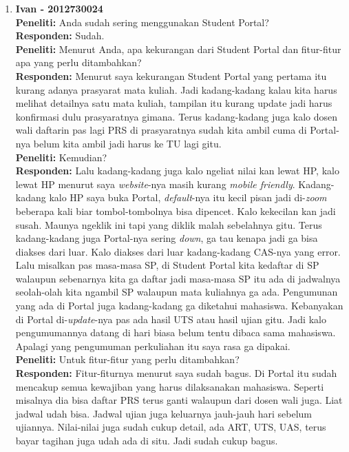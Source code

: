 \begin{enumerate}
\item\textbf{Ivan - 2012730024}\\
	\textbf{Peneliti:} Anda sudah sering menggunakan Student Portal?\\
	\textbf{Responden:} Sudah.\\
	\textbf{Peneliti:} Menurut Anda, apa kekurangan dari Student Portal dan fitur-fitur apa yang perlu ditambahkan?\\
	\textbf{Responden:} Menurut saya kekurangan Student Portal yang pertama itu kurang adanya prasyarat mata kuliah. Jadi kadang-kadang kalau kita harus melihat detailnya satu mata kuliah, tampilan itu kurang update jadi harus konfirmasi dulu prasyaratnya gimana. Terus kadang-kadang juga kalo dosen wali daftarin pas lagi PRS di prasyaratnya sudah kita ambil cuma di Portal-nya belum kita ambil jadi harus ke TU lagi gitu.\\
	\textbf{Peneliti:} Kemudian?\\
	\textbf{Responden:} Lalu kadang-kadang juga kalo ngeliat nilai kan lewat HP, kalo lewat HP menurut saya \textit{website}-nya masih kurang \textit{mobile friendly}. Kadang-kadang kalo HP saya buka Portal, \textit{default}-nya itu kecil pisan jadi di-\textit{zoom} beberapa kali biar tombol-tombolnya bisa dipencet. Kalo kekecilan kan jadi susah. Maunya ngeklik ini tapi yang diklik malah sebelahnya gitu. Terus kadang-kadang juga Portal-nya sering \textit{down}, ga tau kenapa jadi ga bisa diakses dari luar. Kalo diakses dari luar kadang-kadang CAS-nya yang error. Lalu misalkan pas masa-masa SP, di Student Portal kita kedaftar di SP walaupun sebenarnya kita ga daftar jadi masa-masa SP itu ada di jadwalnya seolah-olah kita ngambil SP walaupun mata kuliahnya ga ada. Pengumunan yang ada di Portal juga kadang-kadang ga diketahui mahasiswa. Kebanyakan di Portal di-\textit{update}-nya pas ada hasil UTS atau hasil ujian gitu. Jadi kalo pengumumannya datang di hari biasa belum tentu dibaca sama mahasiswa. Apalagi yang pengumuman perkuliahan itu saya rasa ga dipakai.\\
	\textbf{Peneliti:} Untuk fitur-fitur yang perlu ditambahkan?\\
	\textbf{Responden:} Fitur-fiturnya menurut saya sudah bagus. Di Portal itu sudah mencakup semua kewajiban yang harus dilaksanakan mahasiswa. Seperti misalnya dia bisa daftar PRS terus ganti walaupun dari dosen wali juga. Liat jadwal udah bisa. Jadwal ujian juga keluarnya jauh-jauh hari sebelum ujiannya. Nilai-nilai juga sudah cukup detail, ada ART, UTS, UAS, terus bayar tagihan juga udah ada di situ. Jadi sudah cukup bagus.\\
	

\end{enumerate}
